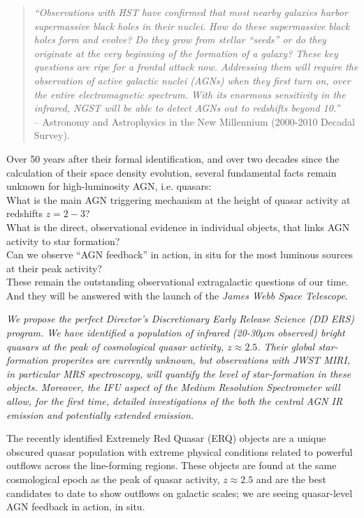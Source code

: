 
\begin{quote}
{\it ``Observations with HST have confirmed that most nearby galaxies harbor supermassive black holes in their nuclei.
How do these supermassive black holes form and evolve? Do they grow from stellar “seeds” or do they originate at the very beginning of the formation of a galaxy? These key questions are ripe for a frontal attack now. Addressing them will require the observation of active galactic nuclei (AGNs) when they first turn on, over the entire electromagnetic spectrum. With its enormous sensitivity in the infrared, NGST will be able to detect AGNs out to redshifts beyond 10.''} \\
-- Astronomy and Astrophysics in the New Millennium (2000-2010 Decadal Survey). 
\end{quote}

\noindent
Over 50 years after their formal identification, and over two decades since the calculation of their space density evolution, several fundamental facts remain unknown for high-luminosity AGN, i.e. quasars: \\
\noindent
What is the main AGN triggering mechanism at the height of quasar activity at redshifts $z=2-3$? \\ 
\noindent
What is the direct, observational evidence in individual objects, that links AGN activity to star formation? \\
\noindent
Can we observe ``AGN feedback'' in action, in situ for the most luminous sources at their peak activity?\\ 

\noindent
These remain the outstanding observational extragalactic questions of
our time. And they will be answered with the launch of the {\it James
Webb Space Telescope}.

\smallskip \smallskip
\noindent
{\it We propose the perfect Director’s Discretionary Early Release Science (DD ERS) program.
We have identified a population of infrared (20-30$\mu$m observed) bright quasars at the peak 
of cosmological quasar activity, $z\approx2.5$. 
Their global star-formation properites are currently unknown, but observations with JWST MIRI, 
in particular MRS spectroscopy, will quantify the level of star-formation in these objects. 
Moreover, the IFU aspect of the Medium Resolution Spectrometer will allow, for the first time, 
detailed investigations of the both the central AGN IR emission and potentially extended emission.
}

\smallskip \smallskip
\noindent
The recently identified Extremely Red Quasar (ERQ) objects are a
unique obscured quasar population with extreme physical conditions
related to powerful outflows across the line-forming regions. These
objects are found at the same cosmological epoch as the peak of quasar
activity, $z\approx2.5$ and are the best candidates to date to show
outflows on galactic scales; we are seeing quasar-level AGN feedback
in action, in situ. 

